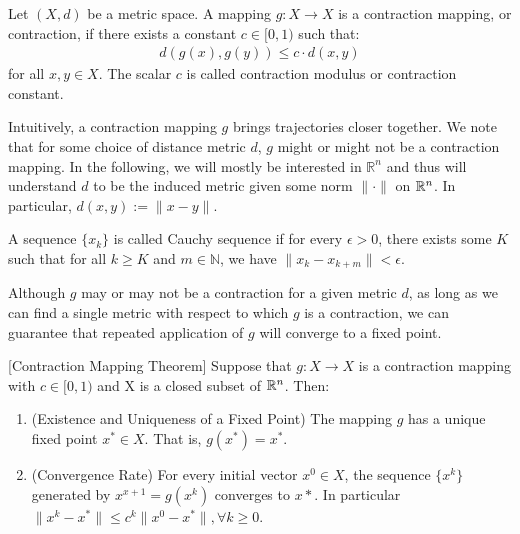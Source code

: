 \documentclass{article}
\begin{document}
\begin{defn}\label{def:contraction mapping}
    Let $(X,d)$ be a metric space. A mapping $g:X \rightarrow X$ is a contraction mapping, or contraction, if there exists a constant $c \in [0, 1)$ such that:
    \begin{align}
        d(g(x),g(y)) \leq c\cdot d(x,y)
    \end{align}
    for all $x,y \in X$. The scalar $c$ is called contraction modulus or contraction constant. 
\end{defn}

Intuitively, a contraction mapping $g$ brings trajectories closer together. We note that for some choice of distance metric $d$, $g$ might or might not be a contraction mapping. In the following, we will mostly be interested in $\mathbb{R}^n$ and thus will understand $d$ to be the induced metric given some norm $\|\cdot\|$ on $\mathbb{R}^n$. In particular, $d(x, y) := \|x - y\|$. 

\begin{defn}
   A sequence $\{x_k\}$ is called Cauchy sequence if for every $\epsilon > 0$, there exists some $K$ such that for all $k\geq K$ and $m \in \mathbb{N}$, we have $\|x_k-x_{k + m}\|< \epsilon$.
\end{defn}

Although $g$ may or may not be a contraction for a given metric $d$, as long as we can find a single metric with respect to which $g$ is a contraction, we can guarantee that repeated application of $g$ will converge to a fixed point. 

\begin{prop} \label{prop:contruction_mappint}[Contraction Mapping Theorem]
Suppose that $g:X\rightarrow X$ is a contraction mapping with $c \in [0,1)$ and X is a closed subset of $\mathbb{R}^n$. Then:
\renewcommand{\labelenumi}{(\alph{enumi})}
\begin{enumerate}
    \item (Existence and Uniqueness of a Fixed Point) The mapping $g$ has a unique fixed point $x^*\in X$. That is, $g(x^*) = x^*$.
    \item (Convergence Rate) For every initial vector $x^0 \in X$, the sequence $\{x^k\}$ generated by $x^{x+1}=g(x^k)$ converges to $x*$. In particular $\|x^k-x^*\| \leq c^k\|x^0-x^*\|, \forall k \geq 0$.
\end{enumerate}
\end{prop}
\end{document}
